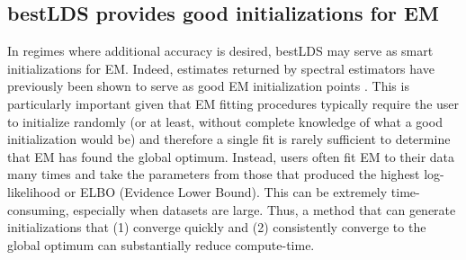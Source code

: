 \subsection{bestLDS provides good initializations for EM}
\label{sec:bestlds:results:4.2}

In regimes where additional accuracy is desired, bestLDS may serve as smart initializations for EM. Indeed, estimates returned by spectral estimators have previously been shown to serve as good EM initialization points \cite{martens_learning_2010, buesing_spectral_2012}. This is particularly important given that EM fitting procedures typically require the user to initialize randomly (or at least, without complete knowledge of what a good initialization would be) and therefore a single fit is rarely sufficient to determine that EM has found the global optimum. Instead, users often fit EM to their data many times and take the parameters from those that produced the highest log-likelihood or ELBO (Evidence Lower Bound). This can be extremely time-consuming, especially when datasets are large. Thus, a method that can generate initializations that (1) converge quickly and (2) consistently converge to the global optimum can substantially reduce compute-time.

